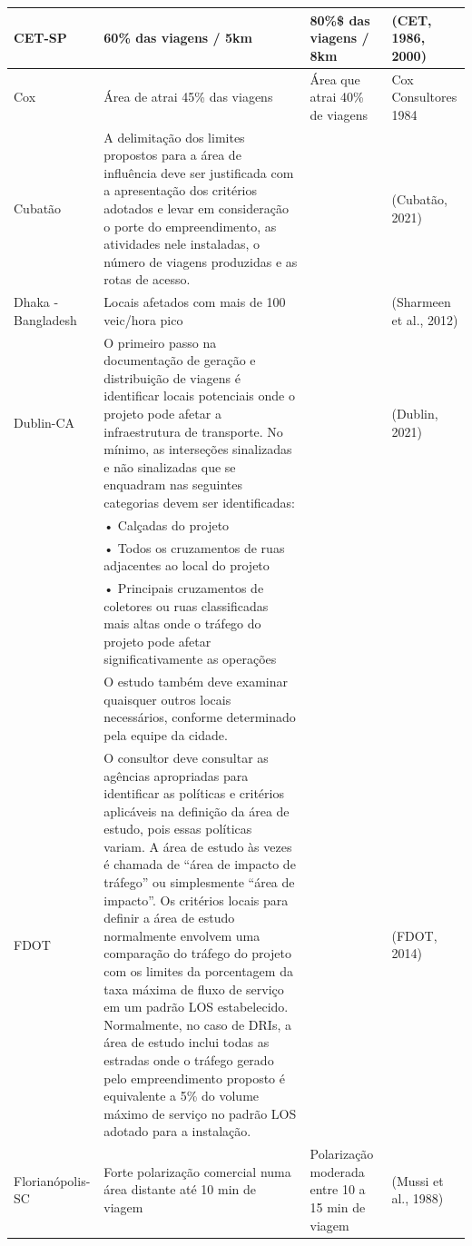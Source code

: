 \documentclass[]{article}
\begin{document}
\begin{table}
\begin{tabular}[t]{l|l|l|l}
\hline
CET-SP & 60\% das viagens / 5km & 80\%\$ das viagens / 8km & (CET, 1986, 2000)\\
\hline
Cox & Área de atrai 45\% das viagens & Área que atrai 40\% de viagens & Cox Consultores 1984\\
\hline
Cubatão & A delimitação dos limites propostos para a área de influência deve ser justificada com a apresentação dos critérios adotados e levar em consideração o porte do empreendimento, as atividades nele instaladas, o número de viagens produzidas e as rotas de acesso. &  & (Cubatão, 2021)\\
\hline
Dhaka -  Bangladesh & Locais afetados com mais de 100 veic/hora pico &  & (Sharmeen et al., 2012)\\
\hline
Dublin-CA & O primeiro passo na documentação de geração e distribuição de viagens é identificar locais potenciais onde o projeto pode afetar a infraestrutura de transporte. No mínimo, as interseções sinalizadas e não sinalizadas que se enquadram nas seguintes categorias devem ser identificadas: &  & (Dublin, 2021)\\
\hline
 & • Calçadas do projeto &  & \\
\hline
 & • Todos os cruzamentos de ruas adjacentes ao local do projeto &  & \\
\hline
 & • Principais cruzamentos de coletores ou ruas classificadas mais altas onde o tráfego do projeto pode afetar significativamente as operações &  & \\
\hline
 & O estudo também deve examinar quaisquer outros locais necessários, conforme determinado pela equipe da cidade. &  & \\
\hline
FDOT & O consultor deve consultar as agências apropriadas para identificar as políticas e critérios aplicáveis na definição da área de estudo, pois essas políticas variam. A área de estudo às vezes é chamada de “área de impacto de tráfego” ou simplesmente “área de impacto”. Os critérios locais para definir a área de estudo normalmente envolvem uma comparação do tráfego do projeto com os limites da porcentagem da taxa máxima de fluxo de serviço em um padrão LOS estabelecido. Normalmente, no caso de DRIs, a área de estudo inclui todas as estradas onde o tráfego gerado pelo empreendimento proposto é equivalente a 5\% do volume máximo de serviço no padrão LOS adotado para a instalação. &  & (FDOT, 2014)\\
\hline
Florianópolis-SC & Forte polarização comercial numa área distante até 10 min de viagem & Polarização moderada entre 10 a 15 min de viagem & (Mussi et al., 1988)\\

\end{tabular}
\end{table}
\end{document}
